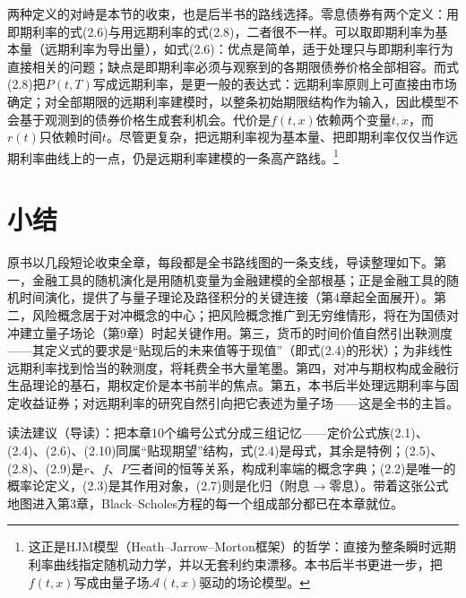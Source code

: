 两种定义的对峙是本节的收束，也是后半书的路线选择。零息债券有两个定义：用即期利率的式(2.6)与用远期利率的式(2.8)，二者很不一样。可以取即期利率为基本量（远期利率为导出量），如式(2.6)：优点是简单，适于处理只与即期利率行为直接相关的问题；缺点是即期利率必须与观察到的各期限债券价格全部相容。而式(2.8)把$P(t,T)$写成远期利率，是更一般的表达式：远期利率原则上可直接由市场确定；对全部期限的远期利率建模时，以整条初始期限结构作为输入，因此模型不会基于观测到的债券价格生成套利机会。代价是$f(t,x)$依赖两个变量$t,x$，而$r(t)$只依赖时间$t$。尽管更复杂，把远期利率视为基本量、把即期利率仅仅当作远期利率曲线上的一点，仍是远期利率建模的一条高产路线。\footnote{这正是HJM模型（Heath--Jarrow--Morton框架）的哲学：直接为整条瞬时远期利率曲线指定随机动力学，并以无套利约束漂移。本书后半书更进一步，把$f(t,x)$写成由量子场$\mathcal{A}(t,x)$驱动的场论模型。}

\section{小结}

原书以几段短论收束全章，每段都是全书路线图的一条支线，导读整理如下。第一，金融工具的随机演化是用随机变量为金融建模的全部根基；正是金融工具的随机时间演化，提供了与量子理论及路径积分的关键连接（第4章起全面展开）。第二，风险概念居于对冲概念的中心；把风险概念推广到无穷维情形，将在为国债对冲建立量子场论（第9章）时起关键作用。第三，货币的时间价值自然引出鞅测度——其定义式的要求是“贴现后的未来值等于现值”（即式(2.4)的形状）；为非线性远期利率找到恰当的鞅测度，将耗费全书大量笔墨。第四，对冲与期权构成金融衍生品理论的基石，期权定价是本书前半的焦点。第五，本书后半处理远期利率与固定收益证券；对远期利率的研究自然引向把它表述为量子场——这是全书的主旨。

读法建议（导读）：把本章10个编号公式分成三组记忆——定价公式族(2.1)、(2.4)、(2.6)、(2.10)同属“贴现期望”结构，式(2.4)是母式，其余是特例；(2.5)、(2.8)、(2.9)是$r$、$f$、$P$三者间的恒等关系，构成利率端的概念字典；(2.2)是唯一的概率论定义，(2.3)是其作用对象，(2.7)则是化归（附息$\to$零息）。带着这张公式地图进入第3章，Black--Scholes方程的每一个组成部分都已在本章就位。

